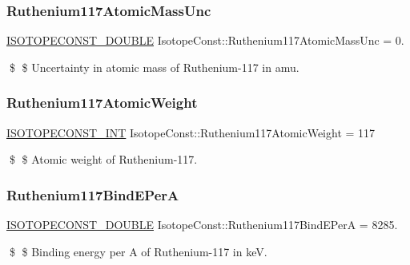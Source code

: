 \subsubsection{\texorpdfstring{Ruthenium117\+Atomic\+Mass\+Unc}{Ruthenium117AtomicMassUnc}}
{\footnotesize\ttfamily \mbox{\hyperlink{group___isotope_const-_macros_ga8f45a7272ce02c0b4c65c44636ed719a}{I\+S\+O\+T\+O\+P\+E\+C\+O\+N\+S\+T\+\_\+\+D\+O\+U\+B\+LE}} Isotope\+Const\+::\+Ruthenium117\+Atomic\+Mass\+Unc = 0.}

\$ \$ Uncertainty in atomic mass of Ruthenium-\/117 in amu. \mbox{\label{group___isotope_const-_ruthenium-_ru117_ga7575e9ef31a86c38c043c84706883006}} 
\subsubsection{\texorpdfstring{Ruthenium117\+Atomic\+Weight}{Ruthenium117AtomicWeight}}
{\footnotesize\ttfamily \mbox{\hyperlink{group___isotope_const-_macros_ga5f18360b3e99483a35c32d789e62621c}{I\+S\+O\+T\+O\+P\+E\+C\+O\+N\+S\+T\+\_\+\+I\+NT}} Isotope\+Const\+::\+Ruthenium117\+Atomic\+Weight = 117}

\$ \$ Atomic weight of Ruthenium-\/117. \mbox{\label{group___isotope_const-_ruthenium-_ru117_gace98c4269b066d8d6ec1d78df829b30f}} 
\subsubsection{\texorpdfstring{Ruthenium117\+Bind\+E\+PerA}{Ruthenium117BindEPerA}}
{\footnotesize\ttfamily \mbox{\hyperlink{group___isotope_const-_macros_ga8f45a7272ce02c0b4c65c44636ed719a}{I\+S\+O\+T\+O\+P\+E\+C\+O\+N\+S\+T\+\_\+\+D\+O\+U\+B\+LE}} Isotope\+Const\+::\+Ruthenium117\+Bind\+E\+PerA = 8285.}

\$ \$ Binding energy per A of Ruthenium-\/117 in keV. \mbox{\label{group___isotope_const-_ruthenium-_ru117_ga77a5dbd98e3e27c7be469aa233de7706}} 
